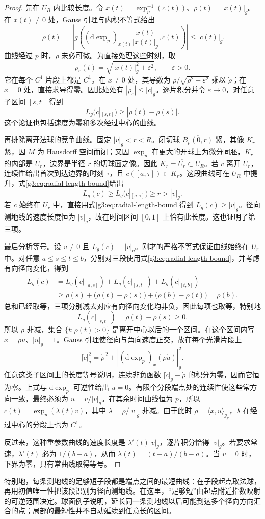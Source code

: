 \begin{proof}
	先在 \(U_R\) 内比较长度。令 \(x(t)=\exp_p^{-1}(c(t))\)、\(\rho(t)=|x(t)|_g\)。在 \(x(t)\ne0\) 处，Gauss 引理与内积不等式给出
	\[
		|\dot\rho(t)|
		=\left|g\left((\mathrm{d}\exp_p)_{x(t)}
			\frac{x(t)}{|x(t)|_g},\dot c(t)\right)\right|
		\le|\dot c(t)|_g.
	\]
	曲线经过 \(p\) 时，\(\rho\) 未必可微。为直接处理这些时刻，取
	\[
		\rho_\varepsilon(t)=\sqrt{|x(t)|_g^2+\varepsilon^2},
		\qquad\varepsilon>0.
	\]
	它在每个 \(C^1\) 片段上都是 \(C^1\)。在 \(x\ne0\) 处，其导数为 \(\rho/\sqrt{\rho^2+\varepsilon^2}\) 乘以 \(\dot\rho\)；在 \(x=0\) 处，直接求导得零。因此处处有 \(|\dot\rho_\varepsilon|\le|\dot c|_g\)。逐片积分并令 \(\varepsilon\to0\)，对任意子区间 \([s,t]\) 得到
	\begin{equation}\label{g3:eq:radial-length-bound}
		L_g(c|_{[s,t]})\ge|\rho(t)-\rho(s)|.
	\end{equation}
	这个论证也包括速度为零和多次经过中心的曲线。

	再排除离开法球的竞争曲线。固定 \(|v|_g<r<R\)。闭切球 \(\overline{B_p(0,r)}\) 紧，其像 \(K_r\) 紧，因 \(M\) 为 Hausdorff 空间而闭；又因 \(\exp_p\) 在更大的开球上为微分同胚，\(K_r\) 的内部是 \(U_r\)，边界是半径 \(r\) 的切球面之像。因此 \(K_r=\overline{U_r}\subset U_R\)。若 \(c\) 离开 \(U_r\)，连续性给出首次到达边界的时刻 \(\tau\)，且 \(c([a,\tau])\subset K_r\)。这段曲线可在 \(U_R\) 中提升，式\eqref{g3:eq:radial-length-bound}给出
	\[
		L_g(c)\ge L_g(c|_{[a,\tau]})\ge r>|v|_g.
	\]
	若 \(c\) 始终在 \(U_r\) 中，直接用式\eqref{g3:eq:radial-length-bound}得到 \(L_g(c)\ge|v|_g\)。径向测地线的速度长度恒为 \(|v|_g\)，故在时间区间 \([0,1]\) 上恰有此长度。这也证明了第三项。

	最后分析等号。设 \(v\ne0\) 且 \(L_g(c)=|v|_g\)。刚才的严格不等式保证曲线始终在 \(U_r\) 中。对任意 \(a\le s\le t\le b\)，分别对三段使用式\eqref{g3:eq:radial-length-bound}，并考虑有向径向变化，得到
	\[
		\begin{aligned}
		L_g(c)
		&=L_g(c|_{[a,s]})+L_g(c|_{[s,t]})+L_g(c|_{[t,b]})\\
		&\ge \rho(s)+\bigl(\rho(t)-\rho(s)\bigr)
			+\bigl(\rho(b)-\rho(t)\bigr)=\rho(b).
		\end{aligned}
	\]
	总和已经取等，三项分别减去对应有向径向变化均非负，因此每项也取等，特别地
	\[
		L_g(c|_{[s,t]})=\rho(t)-\rho(s)\ge0.
	\]
	所以 \(\rho\) 非减，集合 \(\{t:\rho(t)>0\}\) 是离开中心以后的一个区间。在这个区间内写 \(x=\rho u\)、\(|u|_g=1\)。Gauss 引理使径向与角向速度正交，故在每个光滑片段上
	\[
		|\dot c|_g^2
		=\dot\rho^{\,2}
		+\left|(\mathrm{d}\exp_p)_x(\rho\dot u)\right|_g^2.
	\]
	任意这类子区间上的长度等号说明，连续非负函数 \(|\dot c|_g-\dot\rho\) 的积分为零，因而它恒为零。上式与 \(\mathrm{d}\exp_p\) 可逆性给出 \(\dot u=0\)。有限个分段端点处的连续性使这些常方向一致，最终必须为 \(u=v/|v|_g\)。在其余时间曲线恒为 \(p\)，所以 \(c(t)=\exp_p(\lambda(t)v)\)，其中 \(\lambda=\rho/|v|_g\) 非减。由于此时 \(\rho=\langle x,u\rangle_{g_p}\)，\(\lambda\) 在经过中心的分段上也为 \(C^1\)。

	反过来，这种重参数曲线的速度长度是 \(\lambda'(t)|v|_g\)，逐片积分恰得 \(|v|_g\)。若要求常速，\(\lambda'(t)\) 必为 \(1/(b-a)\)，从而 \(\lambda(t)=(t-a)/(b-a)\)。当 \(v=0\) 时，下界为零，只有常曲线取得等号。
\end{proof}

特别地，每条测地线的足够短子段都是端点之间的最短曲线：在子段起点取法球，再用初值唯一性把该段识别为径向测地线。在这里，“足够短”由起点附近指数映射的可逆范围决定。球面例子说明，延长同一条测地线以后可能到达多个径向方向汇合的点；局部的最短性并不自动延续到任意长的区间。
